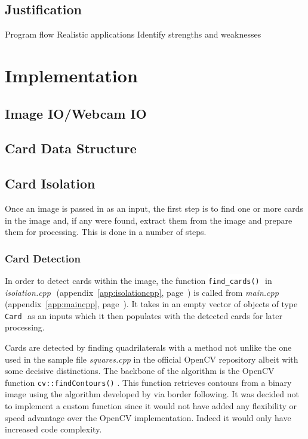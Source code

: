 \documentclass[a4paper,12pt,notitlepage]{article}
\newcommand{\source}[2]{\emph{#1 } (appendix~\ref{#2}, page~\pageref{#2})}
\newcommand{\code}[1]{\colorbox{white}{\lstinline[basicstyle=\ttfamily\color{black}]|#1|} }
\begin{document}
	\subsection{Justification}
		Program flow
		Realistic applications
		Identify strengths and weaknesses
\pagebreak
\section{Implementation}
	\label{sec:implementation}
	\subsection{Image IO/Webcam IO}
		
	\subsection{Card Data Structure}
		
	\subsection{Card Isolation}
		\label{sec:isolation}
		Once an image is passed in as an input, the first step is to find one or more cards in the image and, if any were found, extract them from the image and prepare them for processing. This is done in a number of steps.

		\subsubsection{Card Detection}
			In order to detect cards within the image, the function \code{find_cards()} in \source{isolation.cpp}{app:isolationcpp} is called from \source{main.cpp}{app:maincpp}. It takes in an empty vector of objects of type \code{Card} as an inputs which it then populates with the detected cards for later processing.

			Cards are detected by finding quadrilaterals with a method not unlike the one used in the sample file \emph{squares.cpp} in the official OpenCV repository \autocite{squares} albeit with some decisive distinctions. The backbone of the algorithm is the OpenCV function \code{cv::findContours()}. This function retrieves contours from a binary image using the algorithm developed by \textcite{suzuki1985topological} via border following. It was decided not to implement a custom function since it would not have added any flexibility or speed advantage over the OpenCV implementation. Indeed it would only have increased code complexity.
\end{document}
